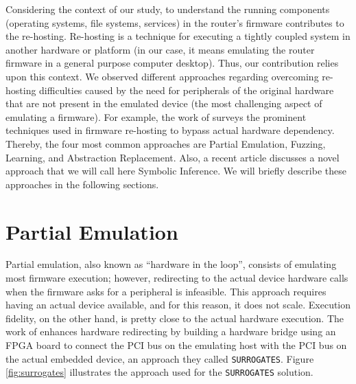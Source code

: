 Considering the context of our study, to understand the running components (operating systems, file systems, services) in the router's firmware contributes to the re-hosting.  Re-hosting is a technique for executing a tightly coupled system in another hardware or platform (in our case, it means emulating the router firmware in a general purpose computer desktop).  Thus, our contribution relies upon this context.  We observed different approaches regarding overcoming re-hosting difficulties caused by the need for peripherals of the original hardware that are not present in the emulated device (the most challenging aspect of emulating a firmware). For example, the work of \cite{firmware-challenges} surveys the prominent techniques used in firmware re-hosting to bypass actual hardware dependency. Thereby, the four most common approaches are Partial Emulation, Fuzzing, Learning, and Abstraction Replacement. Also, a recent article discusses a novel approach that we will call here Symbolic Inference. We will briefly describe these approaches in the following sections.

\section{Partial Emulation}

Partial emulation, also known as ``hardware in the loop'', consists of emulating most firmware execution; however, redirecting to the actual device hardware calls when the firmware asks for a peripheral is infeasible. This approach requires having an actual device available, and for this reason, it does not scale. Execution fidelity, on the other hand, is pretty close to the actual hardware execution. The work of \cite{surrogates} enhances hardware redirecting by building a hardware bridge using an FPGA board to connect the PCI bus on the emulating host with the PCI bus on the actual embedded device, an approach they called {\tt SURROGATES}. Figure \ref{fig:surrogates} illustrates the approach used for the {\tt SURROGATES} solution.

